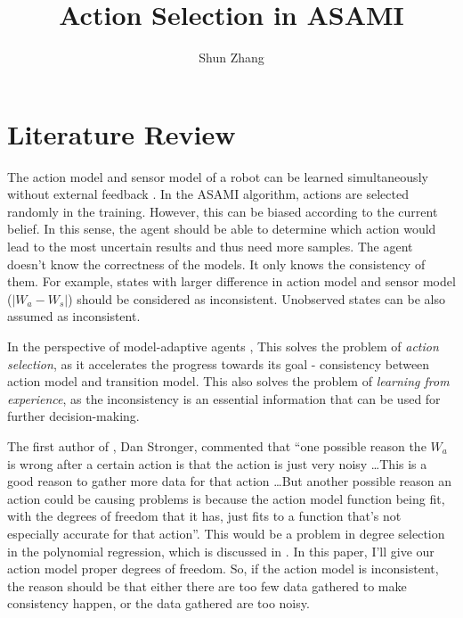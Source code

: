 \documentclass[10pt]{article}
\title{Action Selection in ASAMI}
\author{Shun Zhang}
\date{}
\begin{document}
\maketitle


\sloppy
\section{Literature Review}

The action model and sensor model of a robot can be learned
simultaneously without external feedback \cite{CSJ06}.  In the ASAMI
algorithm, actions are selected randomly in the training. However,
this can be biased according to the current belief.  In this sense,
the agent should be able to determine which action would lead to the
most uncertain results and thus need more samples.  The agent doesn't
know the correctness of the models. It only knows the consistency of
them. For example, states with larger difference in action model and
sensor model ($|W_a - W_s|$) should be considered as inconsistent.
Unobserved states can be also assumed as inconsistent.

In the perspective of model-adaptive agents \cite{maes1993modeling},
This solves the problem of \textit{action selection}, as it
accelerates the progress towards its goal - consistency between action
model and transition model. This also solves the problem of
\textit{learning from experience}, as the inconsistency is an
essential information that can be used for further decision-making.

The first author of \cite{CSJ06}, Dan Stronger, commented that ``one
possible reason the $W_a$ is wrong after a certain action is that the
action is just very noisy \ldots This is a good reason to gather more
data for that action \ldots  But another possible reason  an action
could be causing problems is because the action model function being
fit, with the degrees of freedom that it has, just fits to a function
that's not especially accurate for that action''. This would be a
problem in degree selection in the polynomial regression, which is
discussed in \cite{IJAIT08-stronger}. In this paper, I'll give our
action model proper degrees of freedom. So, if the action model is
inconsistent, the reason should be that either there are too few data
gathered to make consistency happen, or the data gathered are too
noisy.
\end{document}
